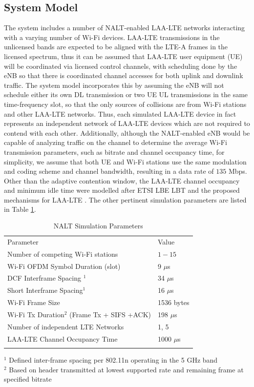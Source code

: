\subsection{System Model}
\label{sys-model}
The system includes a number of NALT-enabled LAA-LTE networks interacting with a varying number of Wi-Fi devices.  LAA-LTE transmissions in the unlicensed bands are expected to be aligned with the LTE-A frames in the licensed spectrum, thus it can be assumed that \mbox{LAA-LTE} user equipment (UE) will be coordinated via licensed control channels, with scheduling done by the eNB so that there is coordinated channel accesses for both uplink and downlink traffic.  The system model incorporates this by assuming the eNB will not schedule either its own DL transmission or two UE UL transmissions in the same time-frequency slot, so that the only sources of collisions are from Wi-Fi stations and other LAA-LTE networks. Thus, each simulated LAA-LTE device in fact represents an independent network of LAA-LTE devices which are not required to contend with each other. Additionally, although the NALT-enabled eNB would be capable of analyzing traffic on the channel to determine the average Wi-Fi transmission parameters, such as bitrate and channel occupancy time, for simplicity, we assume that both UE and \mbox{Wi-Fi} stations use the same modulation and coding scheme and channel bandwidth, resulting in a data rate of $135$ Mbps.  Other than the adaptive contention window, the LAA-LTE channel occupancy and minimum idle time were modelled after ETSI LBE LBT and the proposed mechanisms for \mbox{LAA-LTE} \cite{3gpp}.  The other pertinent simulation parameters are listed in Table \ref{params}.
\begin{table}
	\caption{NALT Simulation Parameters}
	\label{params}      
	\begin{tabular}{p{}p{}}
		\hline\noalign{\smallskip}
		Parameter & Value \\
		\noalign{\smallskip}\svhline\noalign{\smallskip}
		Number of competing \mbox{Wi-Fi} stations& $1 - 15$ \\ 
		Wi-Fi OFDM Symbol Duration (slot) & 9 $\mu$s    \\ 
		DCF Interframe Spacing $^1$ & 34 $\mu$s   \\ 
		Short Interframe Spacing$^1$ & 16 $\mu$s   \\ 
		\mbox{Wi-Fi} Frame Size & 1536 bytes  \\ 
		\mbox{Wi-Fi} Tx Duration$^2$ (Frame Tx + SIFS +ACK) & 198 $\mu$s   \\ 
		Number of independent LTE Networks & 1, 5 \\
		\mbox{LAA-LTE} Channel Occupancy Time  & 1000 $\mu$s \\ 	
		\noalign{\smallskip}\hline\noalign{\smallskip}
	\end{tabular}
	$^1$ Defined inter-frame spacing per 802.11n operating in the 5 GHz band \\
	$^2$ Based on header transmitted at lowest supported rate and remaining frame at specified bitrate	 
\end{table}

